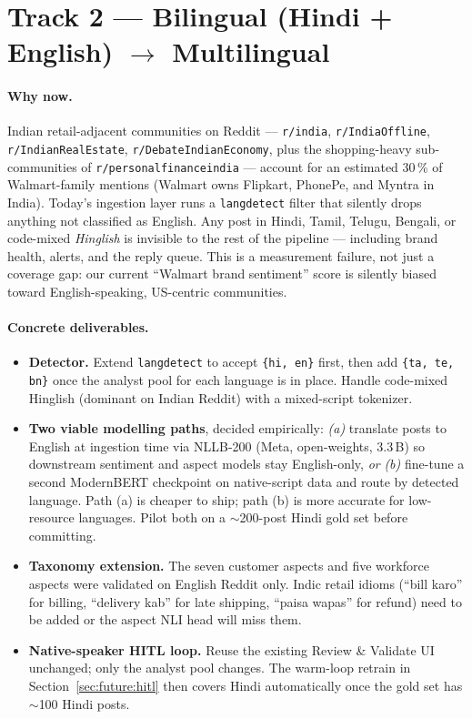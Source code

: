 \section{Track 2 --- Bilingual (Hindi + English) $\to$ Multilingual}\label{sec:future:multilingual}

\paragraph{Why now.}
Indian retail-adjacent communities on Reddit --- \texttt{r/india},
\texttt{r/IndiaOffline}, \texttt{r/IndianRealEstate},
\texttt{r/DebateIndianEconomy}, plus the shopping-heavy
sub-communities of \texttt{r/personalfinanceindia} --- account for an
estimated 30\,\% of Walmart-family mentions (Walmart owns Flipkart,
PhonePe, and Myntra in India).  Today's ingestion layer runs a
\texttt{langdetect} filter that silently drops anything not classified
as English.  Any post in Hindi, Tamil, Telugu, Bengali, or
code-mixed \emph{Hinglish} is invisible to the rest of the pipeline ---
including brand health, alerts, and the reply queue.  This is a
measurement failure, not just a coverage gap: our current
``Walmart brand sentiment'' score is silently biased toward
English-speaking, US-centric communities.

\paragraph{Concrete deliverables.}
\begin{itemize}
\item \textbf{Detector.}  Extend \texttt{langdetect} to accept
      \texttt{\{hi, en\}} first, then add
      \texttt{\{ta, te, bn\}} once the analyst pool for each
      language is in place.  Handle code-mixed Hinglish (dominant on
      Indian Reddit) with a mixed-script tokenizer.
\item \textbf{Two viable modelling paths}, decided empirically:
      \emph{(a)} translate posts to English at ingestion time via
      NLLB-200 (Meta, open-weights, 3.3\,B) so downstream sentiment
      and aspect models stay English-only, \emph{or} \emph{(b)}
      fine-tune a second ModernBERT checkpoint on native-script data
      and route by detected language.  Path (a) is cheaper to ship;
      path (b) is more accurate for low-resource languages.  Pilot
      both on a $\sim$200-post Hindi gold set before committing.
\item \textbf{Taxonomy extension.}  The seven customer aspects and
      five workforce aspects were validated on English Reddit only.
      Indic retail idioms (``bill karo'' for billing, ``delivery
      kab'' for late shipping, ``paisa wapas'' for refund) need to
      be added or the aspect NLI head will miss them.
\item \textbf{Native-speaker HITL loop.}  Reuse the existing Review \&
      Validate UI unchanged; only the analyst pool changes.  The
      warm-loop retrain in Section~\ref{sec:future:hitl} then covers
      Hindi automatically once the gold set has $\sim$100 Hindi posts.
\end{itemize}

